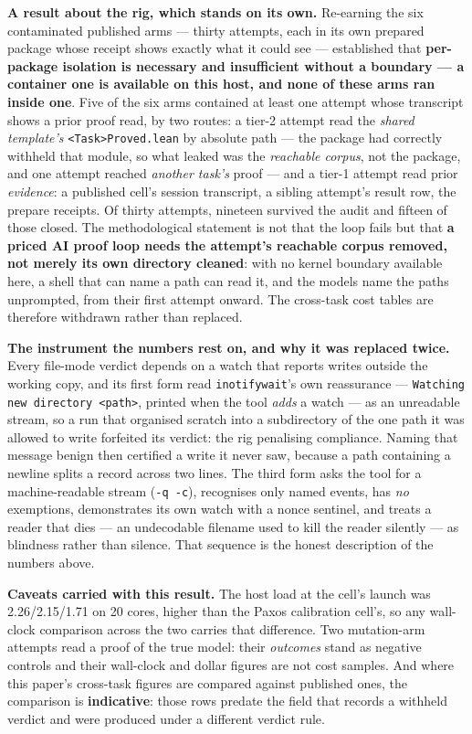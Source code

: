 \documentclass[11pt,a4paper]{article}
\begin{document}
\textbf{A result about the rig, which stands on its own.} Re-earning the six contaminated published arms
--- thirty attempts, each in its own prepared package whose receipt shows exactly what it could see ---
established that \textbf{per-package isolation is necessary and insufficient without a boundary --- a
container one is available on this host, and none of these arms ran inside one}. Five of the six arms contained at least one attempt whose transcript shows a prior proof read,
by two routes: a tier-2 attempt read the \emph{shared template's} \texttt{<Task>Proved.lean} by absolute
path --- the package had correctly withheld that module, so what leaked was the \emph{reachable corpus},
not the package, and one attempt reached \emph{another task's} proof --- and a tier-1 attempt read prior
\emph{evidence}: a published cell's session transcript, a sibling attempt's result row, the prepare
receipts. Of thirty attempts, nineteen survived the audit and fifteen of those closed. The methodological
statement is not that the loop fails but that \textbf{a priced AI proof loop needs the attempt's reachable
corpus removed, not merely its own directory cleaned}: with no kernel boundary available here, a shell
that can name a path can read it, and the models name the paths unprompted, from their first attempt
onward. The cross-task cost tables are therefore withdrawn rather than replaced.

\textbf{The instrument the numbers rest on, and why it was replaced twice.} Every file-mode verdict
depends on a watch that reports writes outside the working copy, and its first form read
\texttt{inotifywait}'s own reassurance --- \texttt{Watching new directory <path>}, printed when the tool
\emph{adds} a watch --- as an unreadable stream, so a run that organised scratch into a subdirectory of the
one path it was allowed to write forfeited its verdict: the rig penalising compliance. Naming that message
benign then certified a write it never saw, because a path containing a newline splits a record across two
lines. The third form asks the tool for a machine-readable stream (\texttt{-q -c}), recognises only named
events, has \emph{no} exemptions, demonstrates its own watch with a nonce sentinel, and treats a reader
that dies --- an undecodable filename used to kill the reader silently --- as blindness rather than
silence. That sequence is the honest description of the numbers above.

\textbf{Caveats carried with this result.} The host load at the cell's launch was 2.26/2.15/1.71 on 20
cores, higher than the Paxos calibration cell's, so any wall-clock comparison across the two carries that
difference. Two mutation-arm attempts read a proof of the true model: their \emph{outcomes} stand as
negative controls and their wall-clock and dollar figures are not cost samples. And where this paper's
cross-task figures are compared against published ones, the comparison is \textbf{indicative}: those rows
predate the field that records a withheld verdict and were produced under a different verdict rule.
\end{document}
